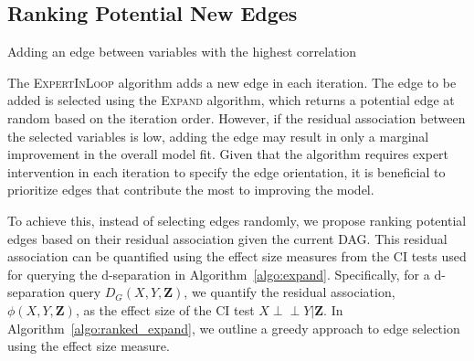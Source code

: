 \documentclass{uai2025} %
\def\ci{\perp\!\!\!\!\perp}
\begin{document}
\subsection{Ranking Potential New Edges}
\label{sec:ranking}

\begin{algorithm}[h]
\DontPrintSemicolon
\SetAlgoLined
{}
\caption{Adding an edge between variables with the highest correlation}
\label{algo:ranked_expand}
\end{algorithm}

The \textsc{ExpertInLoop} algorithm adds a new edge in each iteration. The edge
to be added is selected using the \textsc{Expand} algorithm, which returns a
potential edge at random based on the iteration order. However, if the residual
association between the selected variables is low, adding the edge may result
in only a marginal improvement in the overall model fit. Given that the
algorithm requires expert intervention in each iteration to specify the edge
orientation, it is beneficial to prioritize edges that contribute the most to
improving the model.

To achieve this, instead of selecting edges randomly, we propose ranking
potential edges based on their residual association given the current DAG. This
residual association can be quantified using the effect size measures from the
CI tests used for querying the d-separation in Algorithm~\ref{algo:expand}.
Specifically, for a d-separation query $ D_G(X, Y, \mathbf{Z}) $, we quantify
the residual association, $ \phi(X, Y, \bm{Z}) $, as the effect size of the CI
test $ X \ci Y \rvert \bm{Z} $. In Algorithm~\ref{algo:ranked_expand}, we
outline a greedy approach to edge selection using the effect size measure. 
\end{document}
